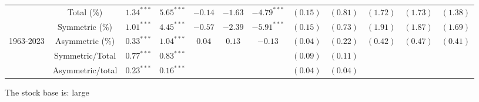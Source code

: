 \documentclass[
]{article}
\begin{document}
\begin{tabular}{lccccccccccc}
   \hline & Total (\%) & $1.34^{***}$ & $5.65^{***}$ & $-0.14$ & $-1.63$ & $-4.79^{***}$ & $(0.15)$ & $(0.81)$ & $(1.72)$ & $(1.73)$ & $(1.38)$ \\ 
   & Symmetric (\%) & $1.01^{***}$ & $4.45^{***}$ & $-0.57$ & $-2.39$ & $-5.91^{***}$ & $(0.15)$ & $(0.73)$ & $(1.91)$ & $(1.87)$ & $(1.69)$ \\ 
   \vspace{5pt}1963-2023 & Asymmetric (\%) & $0.33^{***}$ & $1.04^{***}$ & $0.04$ & $0.13$ & $-0.13$ & $(0.04)$ & $(0.22)$ & $(0.42)$ & $(0.47)$ & $(0.41)$ \\ 
   & Symmetric/Total & $0.77^{***}$ & $0.83^{***}$ &  &  &  & $(0.09)$ & $(0.11)$ &  &  &  \\ 
   & Asymmetric/total & $0.23^{***}$ & $0.16^{***}$ &  &  &  & $(0.04)$ & $(0.04)$ &  &  &  \\ 
   \bottomrule 
\end{tabular}

The stock base is: large
\end{document}
